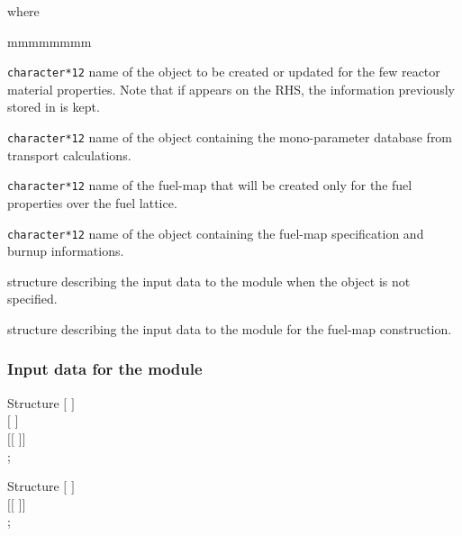 \noindent where
\begin{ListeDeDescription}{mmmmmmmm}

\item[\dusa{MACRO}] \texttt{character*12} name of the 
object to be created or updated for the few reactor material properties.
Note that if  appears on the RHS, the information previously
stored in  is kept.

\item[\dusa{CPO}] \texttt{character*12} name of the  object
containing the mono-parameter database from transport calculations.

\item[\dusa{MACFL}] \texttt{character*12} name of the fuel-map 
that will be created only for the fuel properties over the fuel lattice.

\item[\dusa{FMAP}] \texttt{character*12} name of the  object
containing the fuel-map specification and burnup informations.

\item[\dstr{desccre1}] structure describing the input data to the 
module when the  object is not specified.

\item[\dstr{desccre2}] structure describing the input data to the 
module for the fuel-map  construction.

\end{ListeDeDescription}

\subsubsection{Input data for the  module}

\begin{DataStructure}{Structure }
$[$   $]$ \\
$[$   $]$ \\
 $[[$    $]]$ \\
;
\end{DataStructure}

\begin{DataStructure}{Structure }
$[$   $]$ \\
 $[[$    $]]$ \\
;
\end{DataStructure}

